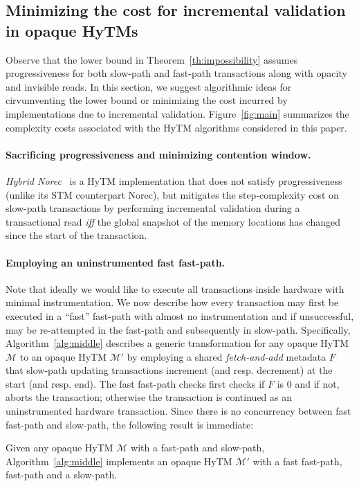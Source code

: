 \subsection{Minimizing the cost for incremental validation in opaque HyTMs}
\label{sec:middlepath}
%
%
Observe that the lower bound in Theorem~\ref{th:impossibility} assumes progressiveness for both slow-path and fast-path transactions
along with opacity and invisible reads.
In this section, we suggest algorithmic ideas for cirvumventing the lower bound or minimizing the cost incurred
by implementations due to incremental validation. Figure~\ref{fig:main} summarizes the complexity costs
associated with the HyTM algorithms considered in this paper.

\paragraph{Sacrificing progressiveness and minimizing contention window.}
%
\emph{Hybrid Norec}~\cite{hybridnorec} is a HyTM implementation that does not satisfy progressiveness
(unlike its STM counterpart Norec), but mitigates
the step-complexity cost on slow-path transactions by performing incremental validation 
during a transactional read \emph{iff} 
the global snapshot of the memory locations has changed since the start of the transaction.
%
%

\paragraph{Employing an uninstrumented fast fast-path.}
Note that ideally we would like to execute all transactions inside hardware with minimal instrumentation.
We now describe how every transaction may first be executed in a ``fast'' fast-path with almost no instrumentation
and if unsuccessful, may be re-attempted in the fast-path and subsequently in slow-path.
Specifically, Algorithm~\ref{alg:middle} describes a generic transformation for any opaque HyTM $\mathcal{M}$ to an opaque
HyTM $\mathcal{M}'$ by employing a shared \emph{fetch-and-add} metadata $F$ that slow-path updating transactions
increment (and resp. decrement) at the start (and resp. end). The fast fast-path checks first checks if $F$ is $0$
and if not, aborts the transaction; otherwise the transaction is continued as an uninstrumented hardware transaction.
Since there is no concurrency between fast fast-path and slow-path, the following result is immediate:
%
%
\begin{theorem}
Given any opaque HyTM $\mathcal{M}$ with a fast-path and slow-path, Algorithm~\ref{alg:middle} implements an opaque HyTM $\mathcal{M}'$
with a fast fast-path, fast-path and a slow-path.
\end{theorem}
%

%